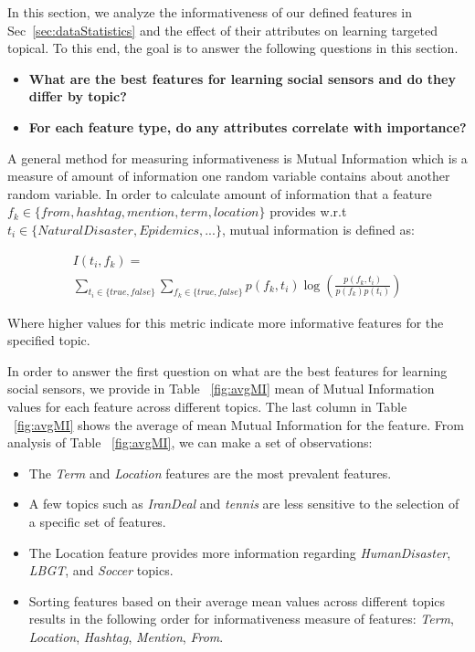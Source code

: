 In this section, we analyze the informativeness of our defined features in Sec~\ref{sec:dataStatistics} and the effect of their attributes on learning targeted topical. To this end, the goal is to answer the following questions in this section.

\begin{itemize}
\item \textbf{What are the best features for learning social sensors and do they differ by topic?}
\item \textbf{For each feature type, do any attributes correlate with importance?}
\end{itemize}

A general method for measuring informativeness is Mutual Information which is a measure of amount of information one random variable contains about another random variable. In order to calculate amount of information that a feature $f_k \in \{from, hashtag, mention, term, location\}$ provides w.r.t $t_i \in \{NaturalDisaster, Epidemics, ...\}$, mutual information is defined as:

\begin{multline}
I(t_i, f_k)= \\
 \sum_{t_i\in \{ true, false \}} \sum_{f_k\in \{ true, false\}}p(f_k,t_i)\log \left ( \frac{p(f_k,t_i)}{p(f_k)p(t_i)} \right )
 \label{eq:eq1}
\end{multline}

Where higher values for this metric indicate more informative features for the specified topic.

In order to answer the first question on what are the best features for learning social sensors, we provide in Table ~\ref{fig:avgMI} mean of Mutual Information values for each feature across different topics. The last column in Table ~\ref{fig:avgMI} shows the average of mean Mutual Information for the feature. From analysis of Table ~\ref{fig:avgMI}, we can make a set of observations:

\begin{itemize}
\item The \textit{Term} and \textit{Location} features are the most prevalent features.%
\item A few topics such as \textit{IranDeal} and \textit{tennis} are less sensitive to the selection of a specific set of features.
\item The Location feature provides more information regarding \textit{HumanDisaster}, \textit{LBGT}, and \textit{Soccer} topics.
\item Sorting features based on their average mean values across different topics results in the following order for informativeness measure of features: \textit{Term}, \textit{Location}, \textit{Hashtag}, \textit{Mention}, \textit{From}.
\end{itemize}

